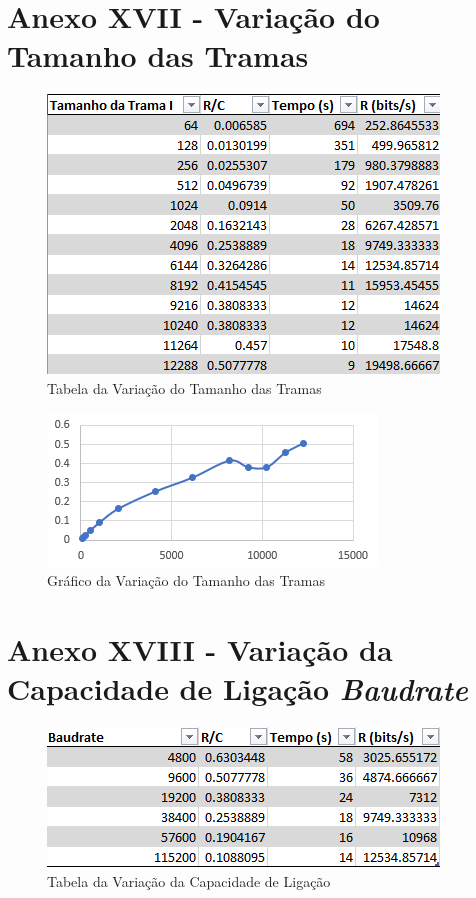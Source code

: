 \documentclass[article, a4paper, 11pt, oneside]{memoir}
\begin{document}
\section{Anexo XVII - Variação do Tamanho das Tramas}

\begin{figure}[htbp]
  \centering        
  \includegraphics[scale=1]{img/tamanho_da_trama_table.png}
  \caption{Tabela da Variação do Tamanho das Tramas}
\end{figure}

\begin{figure}[htbp]
  \centering        
  \includegraphics[scale=1]{img/tamanho_da_trama.png}
  \caption{Gráfico da Variação do Tamanho das Tramas}
\end{figure}

\section{Anexo XVIII - Variação da Capacidade de Ligação \textit{Baudrate}}

\begin{figure}[htbp]
  \centering        
  \includegraphics[scale=1]{img/baudrate_table.png}
  \caption{Tabela da Variação da Capacidade de Ligação}
\end{figure}
\end{document}
